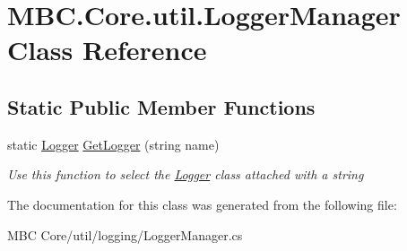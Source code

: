 \hypertarget{class_m_b_c_1_1_core_1_1util_1_1_logger_manager}{\section{M\-B\-C.\-Core.\-util.\-Logger\-Manager Class Reference}
\label{class_m_b_c_1_1_core_1_1util_1_1_logger_manager}
}
\subsection*{Static Public Member Functions}
\begin{DoxyCompactItemize}
\item 
\hypertarget{class_m_b_c_1_1_core_1_1util_1_1_logger_manager_a8ec18cb07826e003bf2eb94ca672840f}{static \hyperlink{class_m_b_c_1_1_core_1_1util_1_1_logger}{Logger} \hyperlink{class_m_b_c_1_1_core_1_1util_1_1_logger_manager_a8ec18cb07826e003bf2eb94ca672840f}{Get\-Logger} (string name)}\label{class_m_b_c_1_1_core_1_1util_1_1_logger_manager_a8ec18cb07826e003bf2eb94ca672840f}

\begin{DoxyCompactList}\small\item\em Use this function to select the \hyperlink{class_m_b_c_1_1_core_1_1util_1_1_logger}{Logger} class attached with a string\end{DoxyCompactList}\end{DoxyCompactItemize}


The documentation for this class was generated from the following file\-:\begin{DoxyCompactItemize}
\item 
M\-B\-C Core/util/logging/Logger\-Manager.\-cs\end{DoxyCompactItemize}
